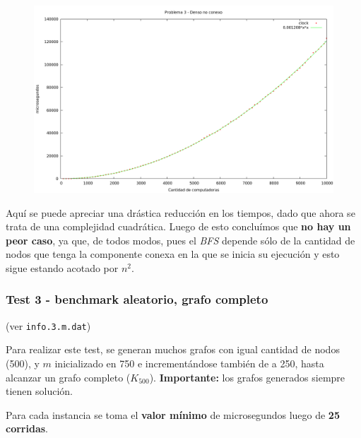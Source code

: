 \vspace*{0.5cm}

\begin{figure}[h]
  \begin{center}
    \includegraphics[scale=0.35]{imagenes/grafico-3-dnc.png}
  \end{center}
\end{figure}

\vspace*{0.5cm}

Aquí se puede apreciar una drástica reducción en los tiempos, dado que ahora se trata de una complejidad cuadrática. Luego de esto concluímos que \textbf{no hay un peor caso}, ya que, de todos modos, pues el \textit{BFS} depende sólo de la cantidad de nodos que tenga la componente conexa en la que se inicia su ejecución y esto sigue estando acotado por $n^2$.



\newpage
\subsubsection{Test 3 - benchmark aleatorio, grafo completo}

(ver \verb|info.3.m.dat|) \medskip

Para realizar este test, se generan muchos grafos con igual cantidad de nodos (500), y $m$ inicializado en 750 e incrementándose también de a 250, hasta alcanzar un grafo completo ($K_{500}$). \textbf{Importante:} los grafos generados siempre tienen solución.

Para cada instancia se toma el \textbf{valor mínimo} de microsegundos luego de
\textbf{25 corridas}.

\vspace*{0.5cm}

